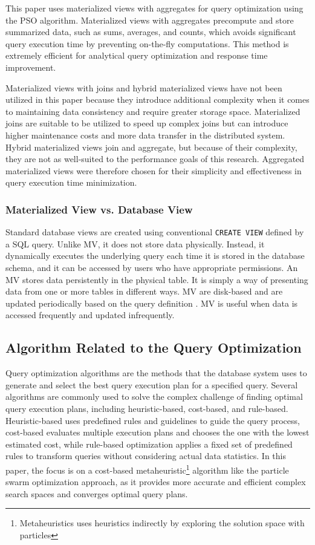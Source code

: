 This paper uses materialized views with aggregates for query optimization using the PSO algorithm. Materialized views with aggregates precompute and store summarized data, such as sums, averages, and counts, which avoids significant query execution time by preventing on-the-fly computations. This method is extremely efficient for analytical query optimization and response time improvement.\vspace{.4cm}

Materialized views with joins and hybrid materialized views have not been utilized in this paper because they introduce additional complexity when it comes to maintaining data consistency and require greater storage space. Materialized joins are suitable to be utilized to speed up complex joins but can introduce higher maintenance costs and more data transfer in the distributed system. Hybrid materialized views join and aggregate, but because of their complexity, they are not as well-suited to the performance goals of this research. Aggregated materialized views were therefore chosen for their simplicity and effectiveness in query execution time minimization.

\subsubsection{Materialized View vs. Database View} Standard database views are created using conventional \texttt{CREATE VIEW} defined by a SQL query. Unlike MV, it does not store data physically. Instead, it dynamically executes the underlying query each time it is stored in the database schema, and it can be accessed by users who have appropriate permissions. An MV stores data persistently in the physical table. It is simply a way of presenting data from one or more tables in different ways. MV are disk-based and are updated periodically based on the query definition \cite{Stackoverflow-author-08-2008}. MV is useful when data is accessed frequently and updated infrequently.

\subsection{Algorithm Related to the Query Optimization }
Query optimization algorithms are the methods that the database system uses to generate and select the best query execution plan for a specified query. Several algorithms are commonly used to solve the complex challenge of finding optimal query execution plans, including heuristic-based, cost-based, and rule-based. Heuristic-based uses predefined rules and guidelines to guide the query process, cost-based evaluates multiple execution plans and chooses the one with the lowest estimated cost, while rule-based optimization applies a fixed set of predefined rules to transform queries without considering actual data statistics. In this paper, the focus is on a cost-based metaheuristic\footnote{Metaheuristics uses heuristics indirectly by exploring the solution space with particles }  algorithm like the particle swarm optimization approach, as it provides more accurate and efficient complex search spaces and converges optimal query plans.


